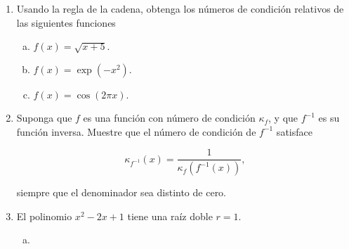 \documentclass[
	spanish,
	8pt,
	utf8,
	xcolor=table,
	handout,
	aspectratio=169,
	professionalfonts,
	notheorems,
	mathserif,
]{beamer}
\begin{document}
\begin{frame}
\begin{enumerate}
		\item

		      Usando la regla de la cadena, obtenga los números de
		      condición relativos de las siguientes funciones
		      \begin{multicols}{3}
			      \begin{enumerate}[a)]

				      \item

				            \begin{math}
					            f\left(x\right)=
					            \sqrt{x+5}.
				            \end{math}

				      \item

				            \begin{math}
					            f\left(x\right)=
					            \exp\left(-x^{2}\right).
				            \end{math}


				      \item

				            \begin{math}
					            f\left(x\right)=
					            \cos\left(2\pi x\right).
				            \end{math}
			      \end{enumerate}
		      \end{multicols}

		\item

		      Suponga que $f$ es una función con número de condición
		      $\kappa_{f}$, y que $f^{-1}$ es su función inversa.
		      Muestre que el número de condición de $f^{-1}$ satisface

		      \begin{equation*}
			      \kappa_{f^{-1}}\left(x\right)=
			      \frac{1}{\kappa_{f}\left(f^{-1}\left(x\right)\right)},
		      \end{equation*}

		      siempre que el denominador sea distinto de cero.


		\item

		      El polinomio $x^{2}-2x+1$ tiene una raíz doble $r=1$.

		      \begin{enumerate}[a)]

			      \item\label{poly:i}


\end{enumerate}
\end{enumerate}
\end{frame}
\end{document}
